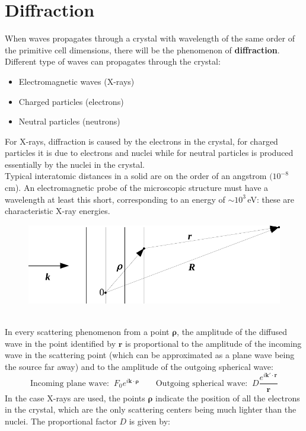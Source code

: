 \documentclass[10.75pt,a4paper,openright,bottom=2cm]{article}
\renewcommand{\Vec}[1]{\boldsymbol{#1}}
\begin{document}
\section{Diffraction}
When waves propagates through a crystal with wavelength of the same order of the primitive cell dimensions, there will be the phenomenon of \textbf{diffraction}. Different type of waves can propagates through the crystal:
\begin{itemize}
    \item Electromagnetic waves (X-rays)
    \item Charged particles (electrons)
    \item Neutral particles (neutrons)
\end{itemize}
For X-rays, diffraction is caused by the electrons in the crystal, for charged particles it is due to electrons and nuclei while for neutral particles is produced essentially by the nuclei in the crystal.\\
Typical interatomic distances in a solid are on the order of an angstrom $(10^{-8}$\,cm). An electromagnetic probe of the microscopic structure must have a wavelength at least this short, corresponding to an energy of $\sim10^3$\,eV: these are characteristic X-ray energies.
\begin{figure}[h]
    \centering
    \includegraphics{diffraction.pdf}
     
    \label{fig:diffraction}
\end{figure}\\
In every scattering phenomenon from a point $\Vec{\rho}$, the amplitude of the diffused wave in the point identified by $\Vec{r}$ is proportional to the amplitude of the incoming wave in the scattering point (which can be approximated as a plane wave being the source far away) and to the amplitude of the outgoing spherical wave:
\[
\text{Incoming plane wave:}\;\; F_0e^{i\Vec{k}\cdot\Vec{\rho}} \qquad \text{Outgoing spherical wave:}\;\; D\frac{e^{i\Vec{k'}\cdot\Vec{r}}}{\Vec{r}}
\]
In the case X-rays are used, the points $\Vec{\rho}$ indicate the position of all the electrons in the crystal, which are the only scattering centers being much lighter than the nuclei. The proportional factor $D$ is given by:
\end{document}
